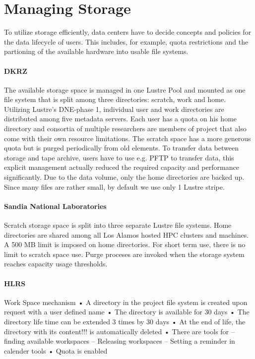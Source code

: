 \documentclass{superfri}
\numberwithin{equation}{section}
\begin{document}
\section{Managing Storage}

To utilize storage efficiently, data centers have to decide concepts and policies for the data lifecycle of users.
This includes, for example, quota restrictions and the partioning of the available hardware into usable file systems.

\paragraph{DKRZ}
The available storage space is managed in one Lustre Pool and mounted as one file system that is split among three directories:
scratch, work and home. 
Utilizing Lustre's DNE-phase 1, individual user and work directories are distributed among five metadata servers.
Each user has a quota on his home directory and consortia of multiple researchers are members of project that also come with their own resource limitations.
The scratch space has a more generous quota but is purged periodically from old elements.
To transfer data between storage and tape archive, users have to use e.g. PFTP to transfer data, this explicit management actually reduced the required capacity and performance significantly.
Due to the data volume, only the home directories are backed up.
Since many files are rather small, by default we use only 1 Lustre stripe.

\paragraph{Sandia National Laboratories}
Scratch storage space is split into three separate Lustre file systems. Home
directories are shared among all Los Alamos hosted HPC clusters and machines.
A 500 MB limit is imposed on home directories. For short term use, there is no
limit to scratch space use. Purge proceses are invoked when the storage system
reaches capacity usage thresholds.


\paragraph{HLRS}
Work Space mechanism
• A directory in the project file system is created upon request
with a user defined name
• The directory is available for 30 days
• The directory life time can be extended 3 times by 30 days
• At the end of life, the directory with its content!!! is
automatically deleted
• There are tools for
– finding available workspaces
– Releasing workspaces
– Setting a reminder in calender tools
• Quota is enabled
\end{document}
